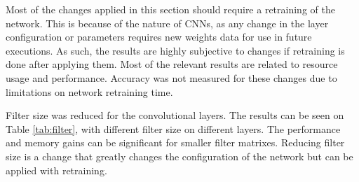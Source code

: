 \begin{enumerate}
Most of the changes applied in this section should require a retraining of the network. This is
because of the nature of CNNs, as any change in the layer configuration or parameters requires
new weights data for use in future executions. As such, the results are highly subjective to
changes if retraining is done after applying them. Most of the relevant results are related
to resource usage and performance. Accuracy was not measured for these changes due to
limitations on network retraining time.

Filter size was reduced for the convolutional layers. The results can be seen on Table \ref{tab:filter},
with different filter size on different layers. The performance and memory gains can be significant
for smaller filter matrixes.
Reducing filter size is a change that greatly changes the configuration of the network but
can be applied with retraining.

\begin{table}[H]
    \begin{center}
        \caption{Execution time and resource usage for different configurations of filter size.}
            \label{tab:filter}
    \end{center}
\end{table}


\end{enumerate}
